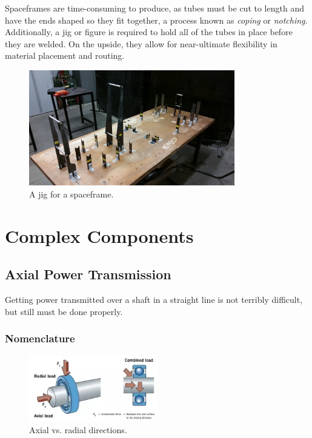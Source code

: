\documentclass[10pt,letterpaper]{book}
\begin{document}
	Spaceframes are time-consuming to produce, as tubes must be cut to length and have the ends shaped so they fit together, a process known as \textit{coping} or \textit{notching}. Additionally, a jig or figure is required to hold all of the tubes in place before they are welded. On the upside, they allow for near-ultimate flexibility in material placement and routing.
	
	\begin{figure}[H]
		\includegraphics[width=0.8\textwidth]{imgs/tradition_tubeframe_jigging.jpeg}
		\caption{A jig for a spaceframe.}
	\end{figure}
	
\chapter{Complex Components}

\section{Axial Power Transmission}

Getting power transmitted over a shaft in a straight line is not terribly difficult, but still must be done properly.

\subsection{Nomenclature}

\begin{figure}[H]
\includegraphics[width=0.5\textwidth]{imgs/radial_axial.png}
\caption{Axial vs. radial directions.}
\end{figure}
\end{document}
